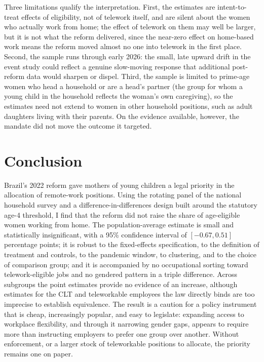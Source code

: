\documentclass[12pt]{article}
\begin{document}
Three limitations qualify the interpretation. First, the estimates are intent-to-treat effects of eligibility, not of telework itself, and are silent about the women who actually work from home; the effect of telework on them may well be larger, but it is not what the reform delivered, since the near-zero effect on home-based work means the reform moved almost no one into telework in the first place. Second, the sample runs through early 2026: the small, late upward drift in the event study could reflect a genuine slow-moving response that additional post-reform data would sharpen or dispel. Third, the sample is limited to prime-age women who head a household or are a head's partner (the group for whom a young child in the household reflects the woman's own caregiving), so the estimates need not extend to women in other household positions, such as adult daughters living with their parents. On the evidence available, however, the mandate did not move the outcome it targeted.

\section{Conclusion}\label{sec:conclusion}

Brazil's 2022 reform gave mothers of young children a legal priority in the allocation of remote-work positions. Using the rotating panel of the national household survey and a difference-in-differences design built around the statutory age-4 threshold, I find that the reform did not raise the share of age-eligible women working from home. The population-average estimate is small and statistically insignificant, with a 95\% confidence interval of $[-0.67, 0.51]$ percentage points; it is robust to the fixed-effects specification, to the definition of treatment and controls, to the pandemic window, to clustering, and to the choice of comparison group; and it is accompanied by no occupational sorting toward telework-eligible jobs and no gendered pattern in a triple difference. Across subgroups the point estimates provide no evidence of an increase, although estimates for the CLT and teleworkable employees the law directly binds are too imprecise to establish equivalence. The result is a caution for a policy instrument that is cheap, increasingly popular, and easy to legislate: expanding access to workplace flexibility, and through it narrowing gender gaps, appears to require more than instructing employers to prefer one group over another. Without enforcement, or a larger stock of teleworkable positions to allocate, the priority remains one on paper.
\end{document}
